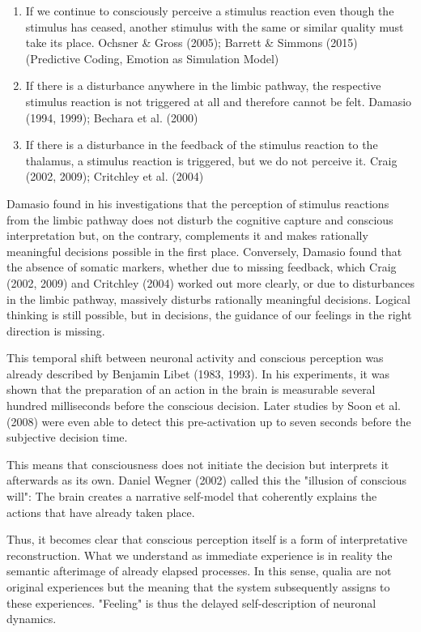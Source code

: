 \begin{enumerate}
  \item If we continue to consciously perceive a stimulus reaction even though the stimulus has ceased, another stimulus with the same or similar quality must take its place. Ochsner & Gross (2005); Barrett & Simmons (2015) (Predictive Coding, Emotion as Simulation Model)
  \item If there is a disturbance anywhere in the limbic pathway, the respective stimulus reaction is not triggered at all and therefore cannot be felt. Damasio (1994, 1999); Bechara et al. (2000)
  \item If there is a disturbance in the feedback of the stimulus reaction to the thalamus, a stimulus reaction is triggered, but we do not perceive it. Craig (2002, 2009); Critchley et al. (2004)
\end{enumerate}

Damasio found in his investigations that the perception of stimulus reactions from the limbic pathway does not disturb the cognitive capture and conscious interpretation but, on the contrary, complements it and makes rationally meaningful decisions possible in the first place. Conversely, Damasio found that the absence of somatic markers, whether due to missing feedback, which Craig (2002, 2009) and Critchley (2004) worked out more clearly, or due to disturbances in the limbic pathway, massively disturbs rationally meaningful decisions. Logical thinking is still possible, but in decisions, the guidance of our feelings in the right direction is missing.

This temporal shift between neuronal activity and conscious perception was already described by Benjamin Libet (1983, 1993). In his experiments, it was shown that the preparation of an action in the brain is measurable several hundred milliseconds before the conscious decision. Later studies by Soon et al. (2008) were even able to detect this pre-activation up to seven seconds before the subjective decision time.

This means that consciousness does not initiate the decision but interprets it afterwards as its own. Daniel Wegner (2002) called this the "illusion of conscious will": The brain creates a narrative self-model that coherently explains the actions that have already taken place.

Thus, it becomes clear that conscious perception itself is a form of interpretative reconstruction. What we understand as immediate experience is in reality the semantic afterimage of already elapsed processes. In this sense, qualia are not original experiences but the meaning that the system subsequently assigns to these experiences. "Feeling" is thus the delayed self-description of neuronal dynamics.

